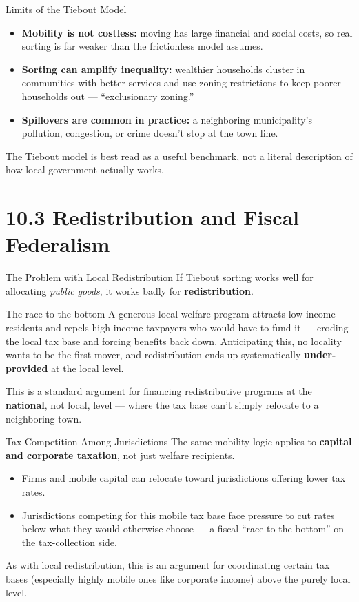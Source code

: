 \documentclass[11pt,aspectratio=169]{beamer}
\begin{document}
\begin{frame}{Limits of the Tiebout Model}
  \begin{itemize}
    \item \textbf{Mobility is not costless:} moving has large financial and social costs, so real sorting is far weaker than the frictionless model assumes.
    \item \textbf{Sorting can amplify inequality:} wealthier households cluster in communities with better services and use zoning restrictions to keep poorer households out --- ``exclusionary zoning.''
    \item \textbf{Spillovers are common in practice:} a neighboring municipality's pollution, congestion, or crime doesn't stop at the town line.
  \end{itemize}
  \small The Tiebout model is best read as a useful benchmark, not a literal description of how local government actually works.
\end{frame}

\section{10.3 Redistribution and Fiscal Federalism}

\begin{frame}{The Problem with Local Redistribution}
  If Tiebout sorting works well for allocating \emph{public goods}, it works badly for \textbf{redistribution}.
  \begin{alertblock}{The race to the bottom}
    A generous local welfare program attracts low-income residents and repels high-income taxpayers who would have to fund it --- eroding the local tax base and forcing benefits back down. Anticipating this, no locality wants to be the first mover, and redistribution ends up systematically \textbf{under-provided} at the local level.
  \end{alertblock}
  \small This is a standard argument for financing redistributive programs at the \textbf{national}, not local, level --- where the tax base can't simply relocate to a neighboring town.
\end{frame}

\begin{frame}{Tax Competition Among Jurisdictions}
  The same mobility logic applies to \textbf{capital and corporate taxation}, not just welfare recipients.
  \begin{itemize}
    \item Firms and mobile capital can relocate toward jurisdictions offering lower tax rates.
    \item Jurisdictions competing for this mobile tax base face pressure to cut rates below what they would otherwise choose --- a fiscal ``race to the bottom'' on the tax-collection side.
  \end{itemize}
  \small As with local redistribution, this is an argument for coordinating certain tax bases (especially highly mobile ones like corporate income) above the purely local level.
\end{frame}
\end{document}
